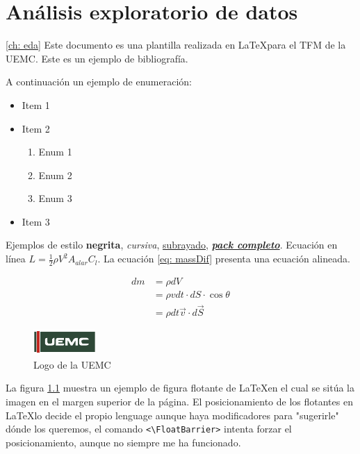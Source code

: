 \chapter{Análisis exploratorio de datos}\ref{ch: eda}
Este documento es una plantilla realizada en \LaTeX para el \gls{TFM} de la \gls{UEMC}. Este es un ejemplo de bibliografía\cite{Finazzi}.

A continuación un ejemplo de enumeración:
\begin{itemize}
	\item Item 1
	\item Item 2
	\begin{enumerate}
		\item Enum 1
		\item Enum 2
		\item Enum 3
	\end{enumerate}
	\item Item 3
\end{itemize}

Ejemplos de estilo \textbf{negrita}, \textit{cursiva}, \underline{subrayado}, \textbf{\textit{\underline{pack completo}}}. Ecuación en línea $L=\frac{1}{2}\rho V^2 A_{alar}C_l$. La ecuación \ref{eq: massDif} presenta una ecuación alineada.

\begin{align}
	\nonumber
	dm &= \rho dV \\ \nonumber
	&= \rho v dt\cdot dS\cdot \cos{\theta}\\ \nonumber
	&= \rho dt \overrightarrow{v}\cdot d\overrightarrow{S}
\end{align}\label{eq: massDif}

\begin{figure}[ht!]
	\centering
	\includegraphics[width=\columnwidth]{Logo/uemc_logo.pdf}
	\caption{Logo de la \gls{UEMC}}
	\label{fig: UEMC_logo}
\end{figure}
La figura \ref{fig: UEMC_logo} muestra un ejemplo de figura flotante de \LaTeX en el cual se sitúa la imagen en el margen superior de la página. El posicionamiento de los flotantes en \LaTeX lo decide el propio lenguage aunque haya modificadores para "sugerirle" dónde los queremos, el comando \verb_<\FloatBarrier>_ intenta forzar el posicionamiento, aunque no siempre me ha funcionado.

